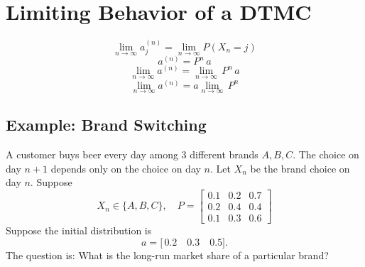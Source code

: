 \documentclass[12pt]{article}
\begin{document}
\section*{Limiting Behavior of a DTMC}

\[
\lim_{n \to \infty} a_{j}^{(n)} = \lim_{n \to \infty} P(X_{n} = j)
\]
\[
a^{(n)} = P^n \, a
\]
\[
\lim_{n \to \infty} a^{(n)} = \lim_{n \to \infty}  \, P^n \, a
\]
\[
\lim_{n \to \infty} a^{(n)} = a\lim_{n \to \infty} \, P^n
\]

\subsection*{Example: Brand Switching}

A customer buys beer every day among 3 different brands \(A, B, C\). The choice on day \(n+1\) depends only on the choice on day \(n\). Let \(X_{n}\) be the brand choice on day \(n\). Suppose
\[
X_{n} \in \{A, B, C\}, \quad
P = \begin{bmatrix}
0.1 & 0.2 & 0.7 \\
0.2 & 0.4 & 0.4 \\
0.1 & 0.3 & 0.6
\end{bmatrix}
\]
Suppose the initial distribution is
\[
a = \bigl[\,0.2 \quad 0.3 \quad 0.5\bigr].
\]
The question is: What is the long-run market share of a particular brand?
\end{document}
